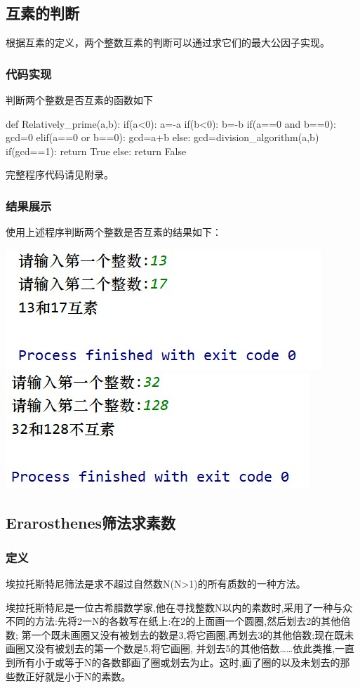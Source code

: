 \documentclass[UTF8]{ctexart}
\begin{document}
\subsection{互素的判断}
\par 根据互素的定义，两个整数互素的判断可以通过求它们的最大公因子实现。
\subsubsection{代码实现}
\par 判断两个整数是否互素的函数如下
\begin{python}
  def Relatively_prime(a,b):
    if(a<0):
        a=-a
    if(b<0):
        b=-b
    if(a==0 and b==0):
        gcd=0
    elif(a==0 or b==0):
        gcd=a+b
    else:
        gcd=division_algorithm(a,b)
    if(gcd==1):
        return True
    else: return False
\end{python}
\par 完整程序代码请见附录。
\subsubsection{结果展示}
\par 使用上述程序判断两个整数是否互素的结果如下：\\
\par 
\includegraphics[width=.4\textwidth]{2.1.jpg}\quad\quad\quad\quad\quad\quad
\includegraphics[width=.4\textwidth]{2.2.jpg}

\subsection{Erarosthenes筛法求素数}
\subsubsection{定义}
\par 埃拉托斯特尼筛法是求不超过自然数N(N>1)的所有质数的一种方法。
\par 埃拉托斯特尼是一位古希腊数学家,他在寻找整数N以内的素数时,采用了一种与众不同的方法:先将2一N的各数写在纸上:在2的上面画一个圆圈,然后划去2的其他倍数;
第一个既未画圈又没有被划去的数是3,将它画圈,再划去3的其他倍数;现在既未画圈又没有被划去的第一个数是5,将它画圈,
并划去5的其他倍数……依此类推,一直到所有小于或等于N的各数都画了圈或划去为止。这时,画了圈的以及未划去的那些数正好就是小于N的素数\cite{ref4}。
\end{document}
